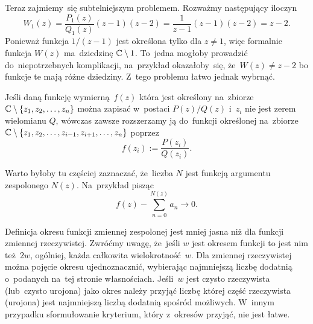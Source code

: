 \documentclass[a4paper,11pt]{article}
\numberwithin{equation}{section}
\begin{document}
Teraz zajmiemy~się subtelniejszym problemem. Rozważmy następujący
iloczyn
\begin{equation}
  \label{eq:Leja-Funkcje-zespolone-35}
  W_{ 1 }( z ) =
  \frac{ P_{ 1 }( z ) }{ Q_{ 1 }( z ) } ( z - 1 ) ( z - 2 ) =
  \frac{ 1 }{ z - 1 } ( z - 1 ) ( z - 2 ) =
  z - 2.
\end{equation}
Ponieważ funkcja $1 / ( z - 1 )$ jest określona tylko dla $z \neq 1$,
więc formalnie funkcja $W( z )$ ma~dziedzinę $\mathbb{C} \setminus 1$.
To~jedna mogłoby prowadzić do~niepotrzebnych komplikacji, na~przykład
okazałoby~się, że~$W( z ) \neq z - 2$ bo funkcje te mają różne
dziedziny. Z~tego problemu łatwo jednak wybrnąć.

Jeśli daną funkcję wymierną~$f( z )$ która jest określony na~zbiorze
$\mathbb{C} \setminus \{ z_{ 1 }, z_{ 2 }, \ldots, z_{ n } \}$ można zapisać
w~postaci $P( z ) / Q( z )$ i~$z_{ i }$ nie jest zerem wielomianu $Q$,
wówczas zawsze rozszerzamy ją do~funkcji określonej na~zbiorze
$\mathbb{C} \setminus \{ z_{ 1 }, z_{ 2 }, \ldots, z_{ i - 1 }, z_{ i + 1 }, \ldots,
z_{ n } \}$ poprzez
\begin{equation}
  \label{eq:Leja-Funkcje-zespolone-36}
  f( z_{ i } ) := \frac{ P( z_{ i } ) }{ Q( z_{ i } ) }.
\end{equation}

\VerSpaceFour





\noindent
{} Warto byłoby tu częściej zaznaczać, że~liczba $N$ jest funkcją
argumentu zespolonego $N( z )$. Na~przykład pisząc
\begin{equation}
  \label{eq:Leja-Funkcje-zespolone-37}
  f( z ) - \sum_{ n = 0 }^{ N( z ) } a_{ n } \to 0.
\end{equation}

\VerSpaceFour





\noindent
{} Definicja okresu funkcji zmiennej zespolonej jest mniej jasna
niż dla funkcji zmiennej rzeczywistej. Zwróćmy uwagę, że~jeśli $w$ jest
okresem funkcji to jest nim też~$2w$, ogólniej, każda całkowita
wielokrotność~$w$. Dla zmiennej rzeczywistej można pojęcie okresu
ujednoznacznić, wybierając najmniejszą liczbę dodatnią o~podanych na~tej
stronie własnościach. Jeśli~$w$ jest czysto rzeczywista (lub~czysto
urojona) jako okres należy przyjąć liczbę której część rzeczywista
(urojona) jest najmniejszą liczbą dodatnią spośród możliwych. W~innym
przypadku sformułowanie kryterium, który z~okresów przyjąć, nie jest łatwe.
\end{document}

